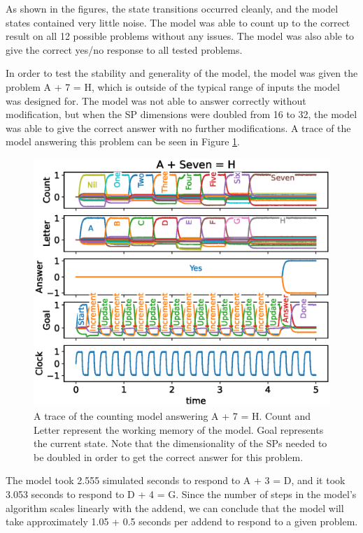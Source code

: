 \documentclass[10pt, a4paper, twocolumn]{article}
\begin{document}
As shown in the figures, the state transitions occurred cleanly, and the model states contained very little noise. The model was able to count up to the correct result on all 12 possible problems without any issues. The model was also able to give the correct yes/no response to all tested problems.

In order to test the stability and generality of the model, the model was given the problem A + 7 = H, which is outside of the typical range of inputs the model was designed for. The model was not able to answer correctly without modification, but when the SP dimensions were doubled from 16 to 32, the model was able to give the correct answer with no further modifications. A trace of the model answering this problem can be seen in Figure \ref{fig:counting-model-results-stress}.

\begin{figure}[h]
	\centering
	\includegraphics[width=1.1\linewidth]{figures/counting-model-results-stress.eps}
	\caption{A trace of the counting model answering A + 7 = H. Count and Letter represent the working memory of the model. Goal represents the current state. Note that the dimensionality of the SPs needed to be doubled in order to get the correct answer for this problem.}
	\label{fig:counting-model-results-stress}
\end{figure}

The model took 2.555 simulated seconds to respond to A + 3 = D, and it took 3.053 seconds to respond to D + 4 = G. Since the number of steps in the model's algorithm scales linearly with the addend, we can conclude that the model will take approximately 1.05 + 0.5 seconds per addend to respond to a given problem.
\end{document}
